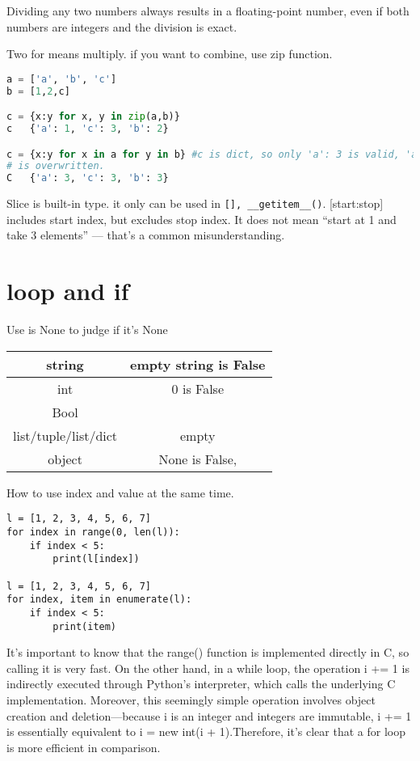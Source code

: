\documentclass[a4paper,12pt,twoside]{book}
\begin{document}
Dividing any two numbers always results in a floating-point number, even if both numbers are integers and the division is exact.

Two for means multiply. if you want to combine, use zip function. 
\begin{lstlisting}[frame=single, language=Python]	
a = ['a', 'b', 'c']
b = [1,2,c]

c = {x:y for x, y in zip(a,b)}
c	{'a': 1, 'c': 3, 'b': 2}

c = {x:y for x in a for y in b} #c is dict, so only 'a': 3 is valid, 'a':1
# is overwritten.
C	{'a': 3, 'c': 3, 'b': 3}	
\end{lstlisting} 

Slice is built-in type. it only can be used in \verb|[], __getitem__()|.  [start:stop] includes start index, but excludes stop index. It does not mean “start at 1 and take 3 elements” — that’s a common misunderstanding.


\section{loop and if}
Use is None to judge if it's None

\begin{tabular}{|c|c|}
	\hline
string 	&  empty string is False\\
	\hline
int	& 0 is False  \\
	\hline
Bool	&  \\
	\hline
list/tuple/list/dict	& empty \\
	\hline
object	&  None is False, \\
	\hline
	
\end{tabular}


How to use index and value at the same time.
\begin{lstlisting}
l = [1, 2, 3, 4, 5, 6, 7]
for index in range(0, len(l)):
	if index < 5:
		print(l[index])        

l = [1, 2, 3, 4, 5, 6, 7]
for index, item in enumerate(l):
	if index < 5:
		print(item)  
\end{lstlisting}

It’s important to know that the range() function is implemented directly in C, so calling it is very fast. On the other hand, in a while loop, the operation i += 1 is indirectly executed through Python’s interpreter, which calls the underlying C implementation. Moreover, this seemingly simple operation involves object creation and deletion—because i is an integer and integers are immutable, i += 1 is essentially equivalent to i = new int(i + 1).Therefore, it's clear that a for loop is more efficient in comparison.	
\end{document}
